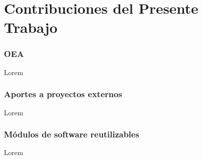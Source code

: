 \chapter{Contribuciones del Presente
Trabajo}\label{contribuciones-del-presente-trabajo}

\subsection{OEA}\label{oea}

Lorem

\subsection{Aportes a proyectos
externos}\label{aportes-a-proyectos-externos}

Lorem

\subsection{Módulos de software
reutilizables}\label{muxf3dulos-de-software-reutilizables}

Lorem
